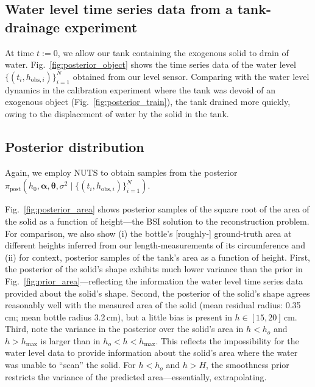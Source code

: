 \documentclass[openacc]{rsproca_new}%
\newcommand\thedata {$\{(t_i,h_{\text{obs}, i})\}_{i=1}^{N}$\xspace}
\newcommand\thedatanomath {\{(t_i,h_{\text{obs}, i})\}_{i=1}^{N}}
\begin{document}
\subsection{Water level time series data from a tank-drainage experiment}
At time $t:=0$, we allow our tank containing the exogenous solid to drain of water. Fig.~\ref{fig:posterior_object} shows the time series data of the water level \thedata obtained from our level sensor. Comparing with the water level dynamics in the calibration experiment where the tank was devoid of an exogenous object (Fig.~\ref{fig:posterior_train}), the tank drained more quickly, owing to the displacement of water by the solid in the tank.

\subsection{Posterior distribution}
Again, we employ NUTS to obtain samples from the posterior $\pi_{\text{post}}(h_0, \boldsymbol \alpha, \boldsymbol \theta, \sigma^2 \mid \thedatanomath)$. 

Fig.~\ref{fig:posterior_area} shows posterior samples of the square root of the area of the solid as a function of height---the BSI solution to the reconstruction problem. 
For comparison, we also show (i) the bottle's [roughly-] ground-truth area at different heights inferred from our length-measurements of its circumference and (ii) for context, posterior samples of the tank's area as a function of height. First, the posterior of the solid's shape exhibits much lower variance than the prior in Fig.~\ref{fig:prior_area}---reflecting the information the water level time series data provided about the solid's shape. 
Second, the posterior of the solid's shape agrees reasonably well with the measured area of the solid (mean residual radius: 0.35\,cm; mean bottle radius 3.2\,cm), but a little bias is present in $h\in[15, 20]$\,cm.
Third, note the variance in the posterior over the solid's area in $h<h_o$ and $h>h_{\text{max}}$ is larger than in $h_o < h < h_{\text{max}}$. This reflects the impossibility for the water level data to provide information about the solid's area where the water was unable to ``scan'' the solid. 
For $h<h_o$ and $h>H$, the smoothness prior restricts the variance of the predicted area---essentially, extrapolating. 
\end{document}
